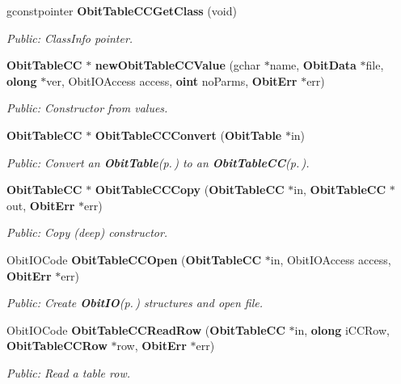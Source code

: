 \begin{CompactItemize}
gconstpointer {\bf Obit\-Table\-CCGet\-Class} (void)
\begin{CompactList}\small\item\em Public: Class\-Info pointer. \item\end{CompactList}\item 
{\bf Obit\-Table\-CC} $\ast$ {\bf new\-Obit\-Table\-CCValue} (gchar $\ast$name, {\bf Obit\-Data} $\ast$file, {\bf olong} $\ast$ver, Obit\-IOAccess access, {\bf oint} no\-Parms, {\bf Obit\-Err} $\ast$err)
\begin{CompactList}\small\item\em Public: Constructor from values. \item\end{CompactList}\item 
{\bf Obit\-Table\-CC} $\ast$ {\bf Obit\-Table\-CCConvert} ({\bf Obit\-Table} $\ast$in)
\begin{CompactList}\small\item\em Public: Convert an {\bf Obit\-Table}{\rm (p.\,\pageref{structObitTable})} to an {\bf Obit\-Table\-CC}{\rm (p.\,\pageref{structObitTableCC})}. \item\end{CompactList}\item 
{\bf Obit\-Table\-CC} $\ast$ {\bf Obit\-Table\-CCCopy} ({\bf Obit\-Table\-CC} $\ast$in, {\bf Obit\-Table\-CC} $\ast$out, {\bf Obit\-Err} $\ast$err)
\begin{CompactList}\small\item\em Public: Copy (deep) constructor. \item\end{CompactList}\item 
Obit\-IOCode {\bf Obit\-Table\-CCOpen} ({\bf Obit\-Table\-CC} $\ast$in, Obit\-IOAccess access, {\bf Obit\-Err} $\ast$err)
\begin{CompactList}\small\item\em Public: Create {\bf Obit\-IO}{\rm (p.\,\pageref{structObitIO})} structures and open file. \item\end{CompactList}\item 
Obit\-IOCode {\bf Obit\-Table\-CCRead\-Row} ({\bf Obit\-Table\-CC} $\ast$in, {\bf olong} i\-CCRow, {\bf Obit\-Table\-CCRow} $\ast$row, {\bf Obit\-Err} $\ast$err)
\begin{CompactList}\small\item\em Public: Read a table row. \item\end{CompactList}\item 

\end{CompactItemize}
